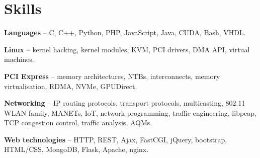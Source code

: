 \section{Skills}
\begin{small}
	\parbox[t][][t]{\linewidth}{
		\textbf{Languages} -- C, C++, Python, PHP, JavaScript, Java, CUDA, Bash, VHDL.
		\smallbreak
	}
	\parbox[t][][t]{\linewidth}{
		\textbf{Linux} -- kernel hacking, kernel modules,
		KVM, PCI drivers, DMA API, virtual machines.
		\smallbreak
	}
	\parbox[t][][t]{\linewidth}{
		\textbf{PCI Express} -- memory architectures, NTBs, 
		interconnects, memory virtualisation, RDMA, NVMe, GPUDirect.
		\smallbreak
	}
	\parbox[t][][t]{\linewidth}{
		\textbf{Networking} -- IP routing protocols, transport protocols,
		multicasting, 802.11 WLAN family, MANETs, IoT, network programming, 
		traffic engineering, libpcap, TCP congestion control, traffic
		analysis, AQMs.
		\smallbreak
	}
	\parbox[t][][t]{\linewidth}{
		\textbf{Web technologies} -- HTTP, REST, Ajax, FastCGI, jQuery,
		bootstrap, HTML/CSS, MongoDB, Flask, Apache, nginx.
		\smallbreak
	}
\end{small}

